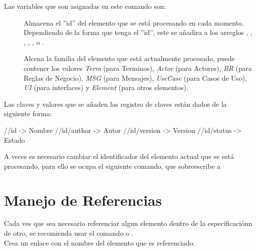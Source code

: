 \noindent Las variables que son asignadas en este comando son:

    \begin{description}
        \item[] Almacena el ''id'' del elemento que se está procesando en cada momento. Dependiendo de la forma que tenga el ''id'', este se añadira a los arreglos , , , , ,  o .
        
        \item[] Alcena la familia del elemento que está actualmente procesado, puede contener los valores {\it Term} (para Terminos), {\it Actor} (para Actores), {\it BR} (para Reglas de Negocio), {\it MSG} (para Mensajes), {\it UseCase} (para Casos de Uso), {\it UI} (para interfaces) y {\it Element} (para otros elementos).
    \end{description}

\noindent Las claves y valores que se añaden las registro de claves están dados de la siguiente forma:
    
    \begin{code}
/\currentElementFamily/id -> Nombre
/\currentElementFamily/id/author -> Autor
/\currentElementFamily/id/version -> Version
/\currentElementFamily/id/status -> Estado
    \end{code}
    
\noindent A veces es necesario cambiar el identificador del elemento actual que se está procesando, para ello se ocupa el siguiente comando, que sobreescribe a 

    \begin{code}
    \end{code}


\clearpage
\section{Manejo de Referencias}

Cada ves que sea necesario referenciar algun elemento dentro de la especificaciónn de otro, se recomienda usar el comando  o .\\

{\bf{}} Crea un enlace con el nombre del elemento que es referenciado.
    \begin{code}
    \end{code}
    
